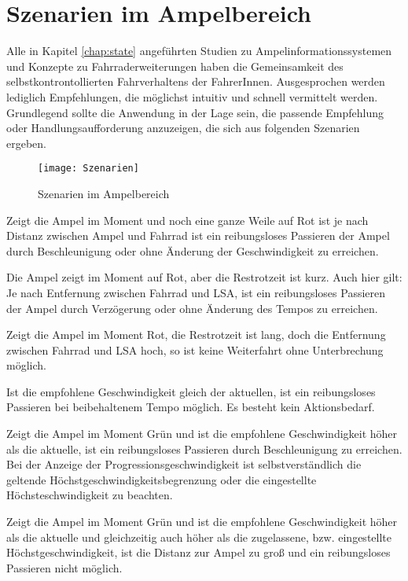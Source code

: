 \chapter{\label{chap:szenarien}Szenarien im Ampelbereich}
Alle in Kapitel \ref{chap:state} angeführten Studien zu Ampelinformationssystemen und Konzepte zu Fahrraderweiterungen haben die Gemeinsamkeit des selbstkontrontollierten Fahrverhaltens der FahrerInnen. Ausgesprochen werden lediglich Empfehlungen, die möglichst intuitiv und schnell vermittelt werden. Grundlegend sollte die Anwendung in der Lage sein, die passende Empfehlung oder Handlungsaufforderung anzuzeigen, die sich aus folgenden Szenarien ergeben.
\begin{figure}[H]  
    \centering  
    \texttt{[image: Szenarien]} 
    \caption[Szenarien]{Szenarien im Ampelbereich}
    \label{fig:szenarien}
\end{figure}
\begin{description}[leftmargin=0.7cm,style=nextline]
\item[Szenario R1:] 
Zeigt die Ampel im Moment und noch eine ganze Weile auf Rot ist je nach Distanz zwischen Ampel und Fahrrad ist ein reibungsloses Passieren der Ampel durch Beschleunigung oder ohne Änderung der Geschwindigkeit zu erreichen.\\
\item[Szenario R2:] 
Die Ampel zeigt im Moment auf Rot, aber die Restrotzeit ist kurz. Auch hier gilt: Je nach Entfernung zwischen Fahrrad und \gls{LSA}, ist ein reibungsloses Passieren der Ampel durch Verzögerung oder ohne Änderung des Tempos zu erreichen.\\
\item[Szenario R3:] 
Zeigt die Ampel im Moment Rot, die Restrotzeit ist lang, doch die Entfernung zwischen Fahrrad und \gls{LSA} hoch, so ist keine Weiterfahrt ohne Unterbrechung möglich.\\
\item[Szenario G1:] Ist die empfohlene Geschwindigkeit gleich der aktuellen, ist ein reibungsloses Passieren bei beibehaltenem Tempo möglich. Es besteht kein Aktionsbedarf.\\
\item[Szenario G2:] 
Zeigt die Ampel im Moment Grün und ist die empfohlene Geschwindigkeit höher als die aktuelle, ist ein reibungsloses Passieren durch Beschleunigung zu erreichen. Bei der Anzeige der Progressionsgeschwindigkeit ist selbstverständlich die geltende Höchstgeschwindigkeitsbegrenzung oder die eingestellte Höchsteschwindigkeit zu beachten.\\ 
\item[Szenario G3:] 
Zeigt die Ampel im Moment Grün und ist die empfohlene Geschwindigkeit höher als die aktuelle und gleichzeitig auch höher als die zugelassene, bzw. eingestellte Höchstgeschwindigkeit, ist die Distanz zur Ampel zu groß und ein reibungsloses Passieren nicht möglich.
\end{description}
